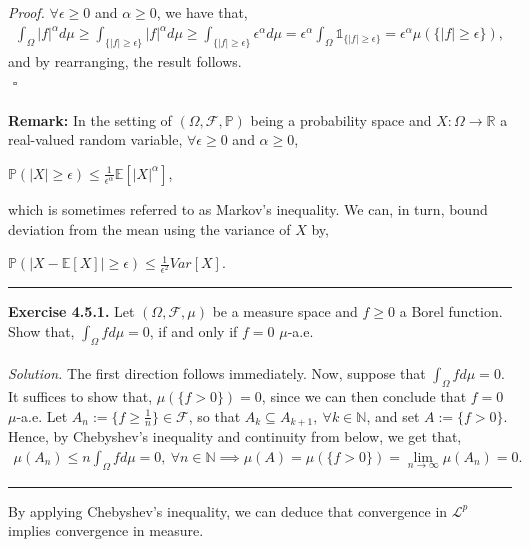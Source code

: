 \documentclass{article}
\begin{document}
\textit{Proof.} $\forall \epsilon \geq 0$ and $\alpha \geq 0$, we have that,
\begin{eqnarray}
\nonumber
\int_\Omega |f|^\alpha d\mu \geq \int_{\{|f| \geq \epsilon\}} |f|^\alpha d\mu \geq \int_{\{|f| \geq \epsilon\}} \epsilon^\alpha d\mu = \epsilon^\alpha \int_\Omega \mathds{1}_{\{|f| \geq \epsilon\}} = \epsilon^\alpha \mu(\{|f|\geq\epsilon\}),
\end{eqnarray}
and by rearranging, the result follows.\\
${}$ \hfill $\square$\\\\
\textbf{Remark:} In the setting of $(\Omega,\mathcal{F},\mathbb{P})$ being a probability space and $X:\Omega\to\mathbb{R}$ a real-valued random variable, $\forall \epsilon \geq 0$ and $\alpha \geq 0$,
\begin{center}
	$\mathbb{P}(|X| \geq \epsilon) \leq \frac{1}{\epsilon^\alpha}\mathbb{E}[|X|^\alpha]$,
\end{center}
which is sometimes referred to as Markov's inequality. We can, in turn, bound deviation from the mean using the variance of $X$ by,
\begin{center}
	$\mathbb{P}(|X - \mathbb{E}[X]| \geq \epsilon) \leq \frac{1}{\epsilon^2}Var[X]$.
\end{center}
\begin{center}
	\noindent\rule{12cm}{0.4pt}
\end{center}
\textbf{Exercise 4.5.1.} Let $(\Omega,\mathcal{F},\mu)$ be a measure space and $f \geq 0$ a Borel function. Show that, $\int_\Omega f d\mu = 0$, if and only if $f = 0$ $\mu$-a.e. \\\\
\textit{Solution.} The first direction follows immediately. Now, suppose that $\int_\Omega f d\mu = 0$. It suffices to show that, $\mu(\{f > 0\}) = 0$, since we can then conclude that $f = 0$ $\mu$-a.e. Let $A_n := \{f\geq\frac{1}{n}\} \in \mathcal{F}$, so that $A_k \subseteq A_{k+1}, \ \forall k \in \mathbb{N}$, and set $A := \{f>0\}$. Hence, by Chebyshev's inequality and continuity from below, we get that,
\begin{eqnarray}
\nonumber
\mu(A_n) \leq n\int_\Omega f d\mu = 0, \ \forall n\in\mathbb{N} \implies  \mu(A) = \mu(\{f>0\}) = \lim_{n\to\infty}\mu(A_n) = 0.
\end{eqnarray}
\begin{center}
	\noindent\rule{12cm}{0.4pt}
\end{center}
By applying Chebyshev's inequality, we can deduce that convergence in $\mathcal{L}^p$ implies convergence in measure.\\\\
\end{document}
